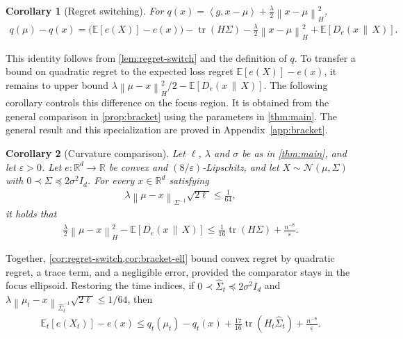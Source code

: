\documentclass[11pt]{article}
\newtheorem{corollary}[corollary]{Corollary}
\newcommand{\R}{\mathbb R}
\newcommand{\E}{\mathbb E}
\newcommand{\N}{\mathcal N}
\newcommand{\tr}{\operatorname{tr}}
\newcommand{\1}{\mathbf 1}
\newcommand{\eps}{\varepsilon}
\newcommand{\ip}[2]{\left\langle #1,#2\right\rangle}
\newcommand{\normm}[2]{\left\lVert #1\right\rVert_{#2}}
\begin{document}
\begin{corollary}[Regret switching]
    \label{cor:regret-switch}
    For
    $q(x)=\ip{g}{x-\mu}+\frac\lambda2\normm{x-\mu}{H}^2$,
    \begin{align}
        q(\mu) - q(x)
        =\bigl(\E[e(X)]-e(x)\bigr)
        -\tr(H\Sigma)
        -\frac\lambda2\normm{x-\mu}{H}^2
        +\E[D_e(x\,\|\,X)].
        \label{eq:q-regret-switch}
    \end{align}
\end{corollary}
This identity follows from \cref{lem:regret-switch} and the definition of $q$.
To transfer a bound on quadratic regret to the expected loss regret
$\E[e(X)]-e(x)$, it remains to upper bound
$\lambda\normm{\mu-x}{H}^2/2-\E[D_e(x\,\|\,X)]$.
The following corollary controls this difference on the focus region.
It is obtained from the general comparison in \cref{prop:bracket} using the parameters in \cref{thm:main}.
The general result and this specialization are proved in Appendix~\ref{app:bracket}.

\begin{corollary}[Curvature comparison]
    \label{cor:bracket-ell}
    Let $\ell$, $\lambda$ and $\sigma$ be as in \cref{thm:main}, and let $\eps>0$.
    Let $e:\R^d\to\R$ be convex and
    $(8/\eps)$-Lipschitz, and let $X\sim\N(\mu,\Sigma)$ with
    $0\prec\Sigma\preceq2\sigma^2I_d$.
    For every $x\in\R^d$ satisfying
    \begin{align}
        \lambda\normm{\mu-x}{\Sigma^{-1}}\sqrt{2\ell}
        \leq\frac1{64},
        \label{eq:bracket-ell-focus}
    \end{align}
    it holds that
    \begin{align}
        \frac\lambda2\normm{\mu-x}{H}^2
        -\E[D_e(x\,\|\,X)]
        \leq\frac1{16}\tr(H\Sigma)
        +\frac{n^{-8}}{\eps}.
        \label{eq:bracket-ell}
    \end{align}
\end{corollary}

Together, \cref{cor:regret-switch,cor:bracket-ell} bound convex regret by
quadratic regret, a trace term, and a negligible error, provided the comparator
stays in the focus ellipsoid. Restoring the time indices, if
$0\prec\widehat\Sigma_t\preceq2\sigma^2I_d$ and
$\lambda\normm{\mu_t-x}{\widehat\Sigma_t^{-1}}\sqrt{2\ell}\leq1/64$, then
\begin{align}
    \E_t[e(X_t)]-e(x)
    \leq q_t(\mu_t)-q_t(x)
    +\frac{17}{16}\tr(H_t\widehat\Sigma_t)
    +\frac{n^{-8}}{\eps}.
    \label{eq:time-indexed-regret-switch}
\end{align}
\end{document}
